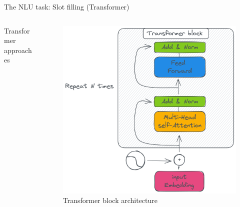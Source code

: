 \documentclass[10pt,aspectratio=169]{beamer}
\begin{document}
\begin{frame}{The NLU task: Slot filling (Transformer)}
\begin{columns}
\begin{column}{0.6\textwidth}
\begin{block}{Transformer approaches}
            \end{block}
        \end{column}
        \begin{column}{0.4\textwidth}
            \begin{figure}
                \centering
                \includegraphics[width=.9\textwidth]{media/transformer-block.png}
                \caption{Transformer block architecture}
            \end{figure}
        \end{column}
    \end{columns}
\end{frame}
\end{document}
